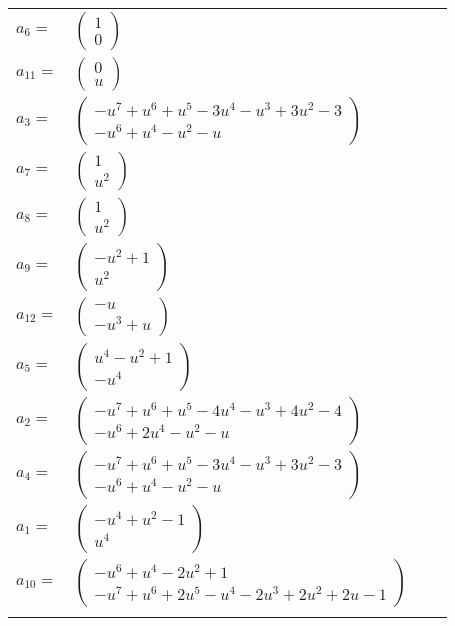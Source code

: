\documentclass[1p]{elsarticle_modified}
\theoremstyle{definition}
\begin{document}
\begin{tabular}{m{7pt} m{180pt} m{7pt} m{180pt} }
\flushright $a_{6}=$&$\begin{pmatrix}1\\0\end{pmatrix}$ \\
\flushright $a_{11}=$&$\begin{pmatrix}0\\u\end{pmatrix}$ \\
\flushright $a_{3}=$&$\begin{pmatrix}- u^7+u^6+u^5-3 u^4- u^3+3 u^2-3\\- u^6+u^4- u^2- u\end{pmatrix}$ \\
\flushright $a_{7}=$&$\begin{pmatrix}1\\u^2\end{pmatrix}$ \\
\flushright $a_{8}=$&$\begin{pmatrix}1\\u^2\end{pmatrix}$ \\
\flushright $a_{9}=$&$\begin{pmatrix}- u^2+1\\u^2\end{pmatrix}$ \\
\flushright $a_{12}=$&$\begin{pmatrix}- u\\- u^3+u\end{pmatrix}$ \\
\flushright $a_{5}=$&$\begin{pmatrix}u^4- u^2+1\\- u^4\end{pmatrix}$ \\
\flushright $a_{2}=$&$\begin{pmatrix}- u^7+u^6+u^5-4 u^4- u^3+4 u^2-4\\- u^6+2 u^4- u^2- u\end{pmatrix}$ \\
\flushright $a_{4}=$&$\begin{pmatrix}- u^7+u^6+u^5-3 u^4- u^3+3 u^2-3\\- u^6+u^4- u^2- u\end{pmatrix}$ \\
\flushright $a_{1}=$&$\begin{pmatrix}- u^4+u^2-1\\u^4\end{pmatrix}$ \\
\flushright $a_{10}=$&$\begin{pmatrix}- u^6+u^4-2 u^2+1\\- u^7+u^6+2 u^5- u^4-2 u^3+2 u^2+2 u-1\end{pmatrix}$\\&\end{tabular}
\end{document}

